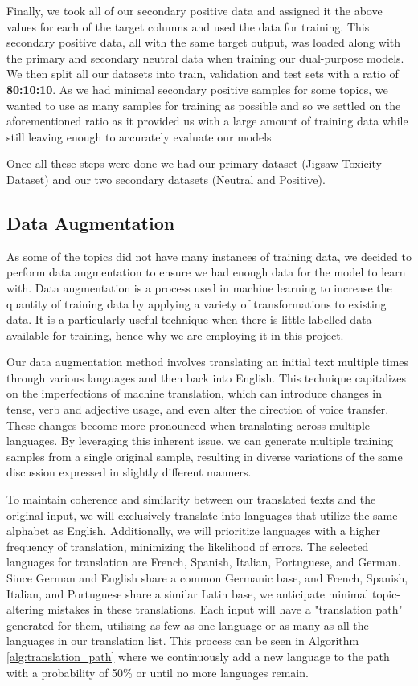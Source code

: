 Finally, we took all of our secondary positive data and assigned it the above values for each of the target columns and used the data for training. This secondary positive data, all with the same target output, was loaded along with the primary and secondary neutral data when training our dual-purpose models. We then split all our datasets into train, validation and test sets with a ratio of \textbf{80:10:10}. As we had minimal secondary positive samples for some topics, we wanted to use as many samples for training as possible and so we settled on the aforementioned ratio as it provided us with a large amount of training data while still leaving enough to accurately evaluate our models

Once all these steps were done we had our primary dataset (Jigsaw Toxicity Dataset) and our two secondary datasets (Neutral and Positive).

\subsection{Data Augmentation}

As some of the topics did not have many instances of training data, we decided to perform data augmentation to ensure we had enough data for the model to learn with. Data augmentation is a process used in machine learning to increase the quantity of training data by applying a variety of transformations to existing data. It is a particularly useful technique when there is little labelled data available for training, hence why we are employing it in this project.

Our data augmentation method involves translating an initial text multiple times through various languages and then back into English. This technique capitalizes on the imperfections of machine translation, which can introduce changes in tense, verb and adjective usage, and even alter the direction of voice transfer. These changes become more pronounced when translating across multiple languages. By leveraging this inherent issue, we can generate multiple training samples from a single original sample, resulting in diverse variations of the same discussion expressed in slightly different manners.

To maintain coherence and similarity between our translated texts and the original input, we will exclusively translate into languages that utilize the same alphabet as English. Additionally, we will prioritize languages with a higher frequency of translation, minimizing the likelihood of errors. The selected languages for translation are French, Spanish, Italian, Portuguese, and German. Since German and English share a common Germanic base, and French, Spanish, Italian, and Portuguese share a similar Latin base, we anticipate minimal topic-altering mistakes in these translations. Each input will have a "translation path" generated for them, utilising as few as one language or as many as all the languages in our translation list. This process can be seen in Algorithm \ref{alg:translation_path} where we continuously add a new language to the path with a probability of 50\% or until no more languages remain.

